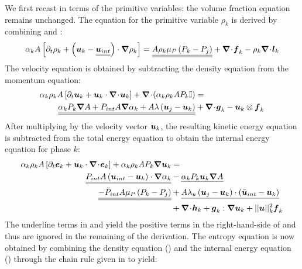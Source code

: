 %
We first recast  in terms of the primitive variables: the volume fraction equation remains unchanged. The equation for the primitive variable $\rho_k$ is derived by combining  and :
%
\begin{equation}\label{eq:rho-7-eqn-model-sect4}
\alpha_k A \left[ \partial_t \rho_k + \left( \boldsymbol u_k - \underline{\underline{\boldsymbol u_{int}}} \right) \cdot \boldsymbol{\nabla} \rho_k \right] = \underline{\underline{A \rho_k \mu_P \left( P_k - P_j \right)}} + \boldsymbol{\nabla}\! \cdot \! \boldsymbol f_k - \rho_k \boldsymbol{\nabla}\! \cdot \! \boldsymbol l_k
\end{equation}
%
The velocity equation is obtained by subtracting the density equation from the momentum equation:
%
\begin{align}\label{eq:vel-7-eqn-model-sect4}
\alpha_k \rho_k  A \left[ \partial_t \boldsymbol u_k + \boldsymbol u_k \cdot \boldsymbol{\nabla}\! \cdot \! \boldsymbol u_k \right]  + \boldsymbol{\nabla}\! \cdot \! \left( \alpha_k \rho_k A P_k \mathbb{I} \right) &=\nonumber\\
\underline{\underline{\alpha_k P_k \boldsymbol{\nabla} A + P_{int} A \boldsymbol{\nabla} \alpha_k + A \lambda \left( \boldsymbol u_j - \boldsymbol u_k \right)}} &+ \boldsymbol{\nabla}\! \cdot \! \boldsymbol g_k - \boldsymbol u_k \otimes \boldsymbol f_k
\end{align}
%
After multiplying  by the velocity vector $\boldsymbol u_k$, the resulting kinetic energy equation is subtracted from the total energy equation to obtain the internal energy equation for phase $k$:
%
\begin{align}\label{eq:int-ener-7-eqn-model-sect4}
\alpha_k \rho_k  A \left[ \partial_t \boldsymbol e_k + \boldsymbol u_k \cdot \boldsymbol{\nabla}\! \cdot \! \boldsymbol e_k \right]  + \alpha_k \rho_k A P_k \boldsymbol{\nabla} \boldsymbol u_k &=\nonumber\\
\underline{\underline{P_{int} A \left(\boldsymbol u_{int}-\boldsymbol u_k \right) \cdot \boldsymbol{\nabla} \alpha_k}} &-  \underline{\alpha_k P_k \boldsymbol u_k \boldsymbol{\nabla} A} \nonumber \\ 
\underline{\underline{-\bar{P}_{int} A \mu_P \left(P_k-P_j \right)}} &+ \underline{A \lambda_u \left(\boldsymbol u_j-\boldsymbol u_k  \right) \cdot \left(\bar{\boldsymbol u}_{int}- \boldsymbol u_k \right)}\nonumber \\
&+ \boldsymbol{\nabla}\! \cdot \! \boldsymbol h_k + \boldsymbol g_k : \boldsymbol{\nabla} \boldsymbol u_k + || \boldsymbol u ||^2_k \boldsymbol f_k
\end{align}
%
The underline terms in  and  yield the positive terms in the right-hand-side of  and thus are ignored in the remaining of the derivation. The entropy equation is now obtained by combining the density equation () and the internal energy equation () through the chain rule given in  to yield:
